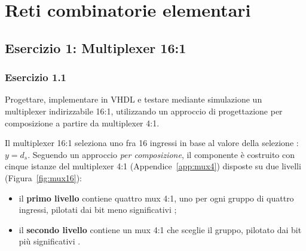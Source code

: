 \chapter{Reti combinatorie elementari}

\section{Esercizio 1: Multiplexer 16:1}

\subsection{Esercizio 1.1}

\begin{traccia}
	Progettare, implementare in VHDL e testare mediante simulazione un multiplexer
	indirizzabile 16:1, utilizzando un approccio di progettazione per composizione a
	partire da multiplexer 4:1.
\end{traccia}

\progetto

Il multiplexer 16:1 seleziona uno fra 16 ingressi  in base al valore
della selezione : $y = d_s$. Seguendo un approccio \emph{per composizione},
il componente è costruito con cinque istanze del multiplexer 4:1 
(Appendice~\ref{app:mux4}) disposte su due livelli (Figura~\ref{fig:mux16}):

\begin{itemize}[nosep]
	\item il \textbf{primo livello} contiene quattro mux 4:1, uno per ogni gruppo di quattro
	      ingressi, pilotati dai bit meno significativi ;
	\item il \textbf{secondo livello} contiene un mux 4:1 che sceglie il gruppo, pilotato dai
	      bit più significativi .
\end{itemize}

